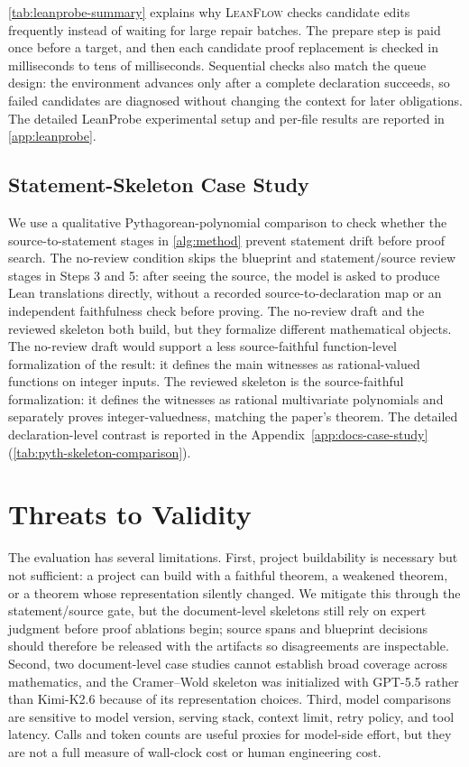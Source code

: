 \documentclass{article}
\newcommand{\method}{\textsc{LeanFlow}\xspace}
\newcommand{\kimi}{Kimi-K2.6\xspace}
\newcommand{\gpt}{GPT-5.5\xspace}
\newcommand{\lean}{Lean\xspace}
\begin{document}
\cref{tab:leanprobe-summary} explains why \method checks candidate edits frequently instead of waiting for large repair batches.
The prepare step is paid once before a target, and then each candidate proof replacement is checked in milliseconds to tens of milliseconds.
Sequential checks also match the queue design: the environment advances only after a complete declaration succeeds, so failed candidates are diagnosed without changing the context for later obligations.
The detailed LeanProbe experimental setup and per-file results are reported in \cref{app:leanprobe}.

\subsection{Statement-Skeleton Case Study}

We use a qualitative Pythagorean-polynomial comparison to check whether the source-to-statement stages in \cref{alg:method} prevent statement drift before proof search.
The no-review condition skips the blueprint and statement/source review stages in Steps 3 and 5: after seeing the source, the model is asked to produce \lean translations directly, without a recorded source-to-declaration map or an independent faithfulness check before proving.
The no-review draft and the reviewed skeleton both build, but they formalize different mathematical objects.
The no-review draft would support a less source-faithful function-level formalization of the result: it defines the main witnesses as rational-valued functions on integer inputs.
The reviewed skeleton is the source-faithful formalization: it defines the witnesses as rational multivariate polynomials and separately proves integer-valuedness, matching the paper's theorem.
The detailed declaration-level contrast is reported in the Appendix~\ref{app:docs-case-study} (\cref{tab:pyth-skeleton-comparison}).

\section{Threats to Validity}

The evaluation has several limitations.
First, project buildability is necessary but not sufficient: a project can build with a faithful theorem, a weakened theorem, or a theorem whose representation silently changed.
We mitigate this through the statement/source gate, but the document-level skeletons still rely on expert judgment before proof ablations begin; source spans and blueprint decisions should therefore be released with the artifacts so disagreements are inspectable.
Second, two document-level case studies cannot establish broad coverage across mathematics, and the Cramer--Wold skeleton was initialized with \gpt rather than \kimi because of its representation choices.
Third, model comparisons are sensitive to model version, serving stack, context limit, retry policy, and tool latency.
Calls and token counts are useful proxies for model-side effort, but they are not a full measure of wall-clock cost or human engineering cost.
\end{document}
